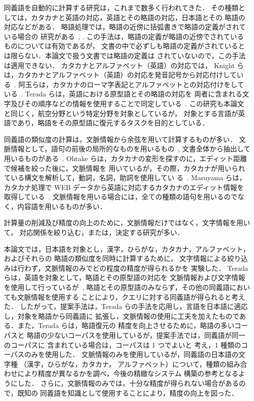 \documentclass[japanese]{jnlp_1.4}
\begin{document}
同義語を自動的に計算する研究は，これまで数多く行われてきた．
その種類としては，カタカナと英語の対応，英語とその略語の対応，日本語とその
略語の対応などがある．
略語処理では，略語の近傍に括弧書きで略語の定義がされている場合の
研究がある~\cite{schwartz03}, \cite{pustejovsky01}. 
この手法は，略語の定義が略語の近傍でされているものについては有効であるが，
文書の中で必ずしも略語の定義がされているとは限らない．本論文で扱う文書では略語の定義は
されていないので，この手法は適用できない．
カタカナとアルファベット（英語）の対応では，
Knight らは，カタカナとアルファベット（英語）の対応を発音記号から対応付けしている~\cite{knight98}.
阿玉らは，カタカナのローマ字表記とアルファベットとの対応付けをしている~\cite{adama04}. 
Terada らは，英語における原型語とその略語の対応を
両者に含まれる文字及びその順序などの情報を使用することで同定している~\cite{terada04}. 
この研究も本論文と同じく，航空分野という特定分野を対象としているが，
対象とする言語が英語であり，略語をその原型語に復元するタスクを目的としている．

同義語の類似度の計算は，文脈情報から余弦を用いて計算するものが多い．
文脈情報として，語句の前後の局所的なものを用いるもの~\cite{terada04}, 文書全体から抽出して
用いるものがある~\cite{sakai05}. 
Ohtake らは，カタカナの変形を探すのに，エディット距離で候補を絞った後に，文脈情報を
用いているが，その際，カタカナが用いられている構文を解析して，動詞，名詞，助詞を使用してい
る~\cite{ohtake04}. 
Masuyama らは，カタカナ処理で WEB データから英語に対応するカタカナのエディット情報を取得している~\cite{masuyama05}. 
文脈情報を用いる場合には，全ての種類の語句を用いるのでなく，内容語を用いるものが多い．

計算量の削減及び精度の向上のために，文脈情報だけではなく，文字情報を用いて，
対応関係を絞り込む，または，決定する研究が多い．

本論文では，日本語を対象とし，漢字，ひらがな，カタカナ，アルファベット，およびそれらの
略語の類似度を同時に計算するために，
文字情報による絞り込みは行わず，文脈情報のみでどの程度の精度が得られるかを
実験した．
Terada らは，英語を対象として，略語とその原型語の対応を
文脈情報および文字情報を使用して行っているが~\cite{terada04}, 
略語とその原型語のみならず，その他の同義語においても文脈情報を使用する
ことにより，クエリに対する同義語が得られると考えた．
したがって，提案手法は，Terada らの手法を応用し，言語を日本語に適応し，対象を略語から同義語に
拡張し，文脈情報の使用に工夫を加えたものである．また，Terada らは，略語復元の
精度を向上させるために，略語の多いコーパスと
略語の少ないコーパスを使用しているが，提案手法では，同義語が同一のコーパスに
含まれている場合は，コーパスは 1 つでよいと
考え，1 種類のコーパスのみを使用した．
文脈情報のみを使用しているが，同義語の日本語の文字種
（漢字，ひらがな，カタカナ，
アルファベット）について，種類の組み合わせにより精度が異なるかを調べ，今後の精緻なシステム
構築の参考となるようにした．
さらに，文脈情報のみでは，十分な精度が得られない場合があるので，既知の
同義語を知識として使用することにより，精度の向上を図った．
\end{document}
